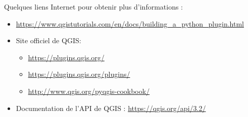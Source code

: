 \documentclass[11pt]{article}
\begin{document}
Quelques liens Internet pour obtenir plus d'informations :
\vspace*{0.4em}
\begin{itemize}\itemsep0.64em
\renewcommand\labelitemi{\---}
\item \url{https://www.qgistutorials.com/en/docs/building_a_python_plugin.html}
\item Site officiel de QGIS:
\begin{itemize}\itemsep0.2em
\renewcommand\labelitemii{\--}
\item \url{https://plugins.qgis.org/}
\item \url{https://plugins.qgis.org/plugins/}
\item \url{http://www.qgis.org/pyqgis-cookbook/}
\end{itemize}
\item Documentation de l'API de QGIS : \url{https://qgis.org/api/3.2/}
\end{itemize}

\vfill{}
\hrulefill
\vspace*{1.6em}

\hrulefill
\vspace*{1.6em}

\hrulefill
\vspace*{1.6em}

\hrulefill
\vspace*{1.6em}

\hrulefill
\vspace*{1.6em}

\hrulefill
\vspace*{1.6em}

\hrulefill
\vspace*{1.6em}

\hrulefill
\vspace*{1.6em}

\hrulefill
\vspace*{1.6em}

\hrulefill
\vspace*{1.6em}

\hrulefill
\vspace*{1.6em}

\hrulefill
\vspace*{1.6em}

\hrulefill
\vspace*{1.6em}

\hrulefill
\vspace*{1.6em}

\hrulefill
\vspace*{1.6em}

\hrulefill
\vspace*{1.6em}
\end{document}
